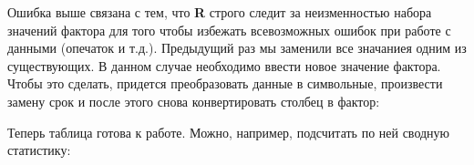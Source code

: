 \documentclass[]{book}
\newenvironment{Shaded}{\begin{snugshade}}{\end{snugshade}}
\newcommand{\KeywordTok}[1]{\textcolor[rgb]{0.13,0.29,0.53}{\textbf{#1}}}
\newcommand{\StringTok}[1]{\textcolor[rgb]{0.31,0.60,0.02}{#1}}
\newcommand{\OperatorTok}[1]{\textcolor[rgb]{0.81,0.36,0.00}{\textbf{#1}}}
\newcommand{\NormalTok}[1]{#1}
\begin{document}
Ошибка выше связана с тем, что \textbf{R} строго следит за неизменностью
набора значений фактора для того чтобы избежать всевозможных ошибок при
работе с данными (опечаток и т.д.). Предыдущий раз мы заменили все
значаниея одним из существующих. В данном случае необходимо ввести новое
значение фактора. Чтобы это сделать, придется преобразовать данные в
символьные, произвести замену срок и после этого снова конвертировать
столбец в фактор:

\begin{Shaded}
\end{Shaded}

Теперь таблица готова к работе. Можно, например, подсчитать по ней
сводную статистику:
\end{document}
